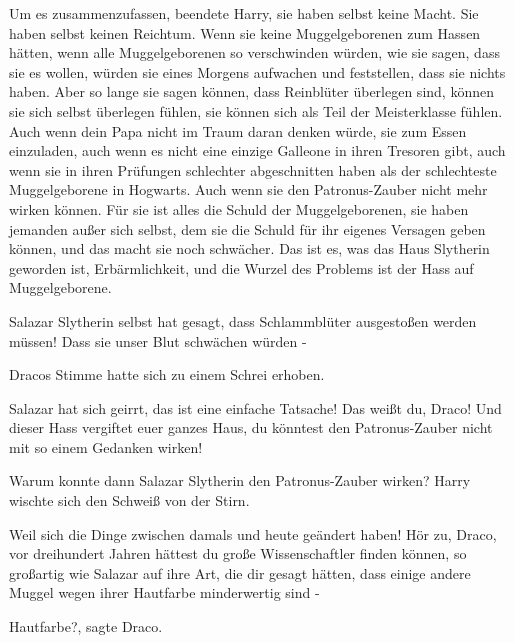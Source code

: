 \glqq{}Um es zusammenzufassen\grqq{}, beendete Harry, \glqq{}sie haben selbst
keine Macht. Sie haben selbst keinen Reichtum. Wenn sie keine Muggelgeborenen
zum Hassen hätten, wenn alle Muggelgeborenen so verschwinden würden, wie sie
sagen, dass sie es wollen, würden sie eines Morgens aufwachen und feststellen,
dass sie nichts haben. Aber so lange sie sagen können, dass Reinblüter überlegen
sind, können sie sich selbst überlegen fühlen, sie können sich als Teil der
Meisterklasse fühlen. Auch wenn dein Papa nicht im Traum daran denken würde,
sie zum Essen einzuladen, auch wenn es nicht eine einzige Galleone in ihren
Tresoren gibt, auch wenn sie in ihren Prüfungen schlechter abgeschnitten haben
als der schlechteste Muggelgeborene in Hogwarts. Auch wenn sie den
Patronus-Zauber nicht mehr wirken können. Für sie ist alles die Schuld der
Muggelgeborenen, sie haben jemanden außer sich selbst, dem sie die Schuld für
ihr eigenes Versagen geben können, und das macht sie noch schwächer. Das ist es,
was das Haus Slytherin geworden ist, Erbärmlichkeit, und die Wurzel des Problems
ist der Hass auf Muggelgeborene.\grqq{}

\glqq{}Salazar Slytherin selbst hat gesagt, dass Schlammblüter ausgestoßen werden
müssen! Dass sie unser Blut schwächen würden -\grqq{}

Dracos Stimme hatte sich zu einem Schrei erhoben.

\glqq{}Salazar hat sich geirrt, das ist eine einfache Tatsache! Das weißt du,
Draco! Und dieser Hass vergiftet euer ganzes Haus, du könntest den
Patronus-Zauber nicht mit so einem Gedanken wirken!\grqq{}

\glqq{}Warum konnte dann Salazar Slytherin den Patronus-Zauber wirken?\grqq{}
Harry wischte sich den Schweiß von der Stirn.

\glqq{}Weil sich die Dinge zwischen damals und heute geändert haben! Hör zu,
Draco, vor dreihundert Jahren hättest du große Wissenschaftler finden können, so
großartig wie Salazar auf ihre Art, die dir gesagt hätten, dass einige andere
Muggel wegen ihrer Hautfarbe minderwertig sind -\grqq{}

\glqq{}Hautfarbe?\grqq{}, sagte Draco.

